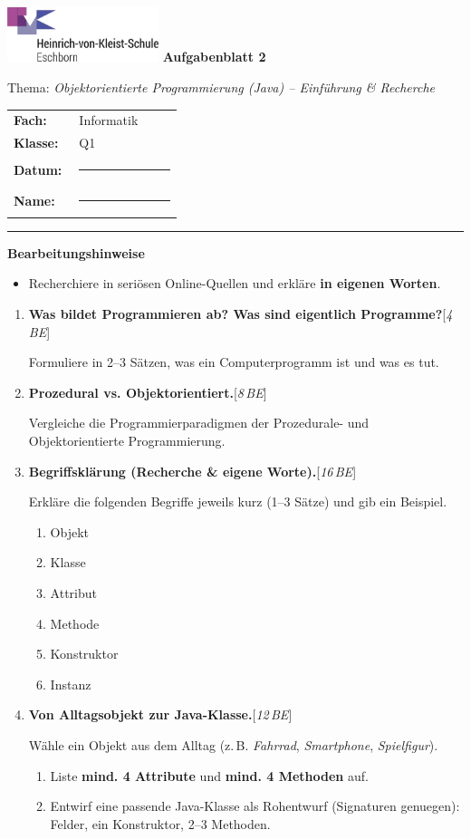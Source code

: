 \documentclass[11pt,a4paper]{scrartcl}
\newcommand{\blatttyp}{Aufgabenblatt 2}
\newcommand{\thema}{\textit{Objektorientierte Programmierung (Java) -- Einführung \& Recherche}}
\newcommand{\sheettitle}[2]{%
	\begin{minipage}[t]{0.62\linewidth}
		\includegraphics[height=1.6cm]{hvk-logo.png}  %
		\vspace{0.6em}
		{\Large\bfseries #1}\par\vspace{-0.2em}
		{\normalsize #2}
	\end{minipage}\hfill
	\begin{minipage}[t]{0.35\linewidth}
		\renewcommand{\arraystretch}{1.2}
		\begin{tabular}{>{\bfseries}p{0.36\linewidth}p{0.58\linewidth}}
			Fach: & Informatik\\
			Klasse: & Q1\\
			Datum: & \rule{3.8cm}{0.4pt} \\
			Name: & \rule{3.8cm}{0.4pt} \\
		\end{tabular}
	\end{minipage}
	\vspace{0.8em}\par\hrule\vspace{1.0em}
}
\newenvironment{aufgaben}{%
	\begin{enumerate}[leftmargin=*,label=\textbf{Aufgabe~\arabic*:}]
	}{\end{enumerate}}
\newcommand{\punkte}[1]{\hfill{\small[\textit{#1\,BE}]}}
\newenvironment{hinweise}{%
	\vspace{0.2em}\textbf{Bearbeitungshinweise}\par
	\begin{itemize}[leftmargin=*,topsep=0.3em,itemsep=0.2em]
	}{\end{itemize}\vspace{0.5em}}
\begin{document}
	
	\sheettitle{\blatttyp}{Thema: \thema}
	
	\begin{hinweise}
		\item Recherchiere in seriösen Online-Quellen und erkläre \textbf{in eigenen Worten}.
	\end{hinweise}
	
	\begin{aufgaben}
		
		\item \textbf{Was bildet Programmieren ab? Was sind eigentlich Programme?}\punkte{4}
		
		Formuliere in 2--3 Sätzen, was ein Computerprogramm ist und was es tut.
		
		\vspace{0.4cm}
		
		\item \textbf{Prozedural vs. Objektorientiert.}\punkte{8}
		
		Vergleiche die Programmierparadigmen der Prozedurale- und Objektorientierte Programmierung.
		\vspace{0.4cm}
		
		\item \textbf{Begriffsklärung (Recherche \& eigene Worte).}\punkte{16}
		
		Erkläre die folgenden Begriffe jeweils kurz (1--3 Sätze) und gib ein Beispiel.
		\begin{enumerate}
			\item Objekt
			\item Klasse
			\item Attribut
			\item Methode
			\item Konstruktor
			\item Instanz
		\end{enumerate}
 
		

		
		\vspace{0.4cm}
		
		\item \textbf{Von Alltagsobjekt zur Java-Klasse.}\punkte{12}
		
		Wähle ein Objekt aus dem Alltag (z.\,B. \emph{Fahrrad}, \emph{Smartphone}, \emph{Spielfigur}).
		\begin{enumerate}[label=\alph*)]
			\item Liste \textbf{mind. 4 Attribute} und \textbf{mind. 4 Methoden} auf.
			\item Entwirf eine passende Java-Klasse als Rohentwurf (Signaturen genuegen): Felder, ein Konstruktor, 2--3 Methoden.
		\end{enumerate}
		

\end{aufgaben}
\end{document}
